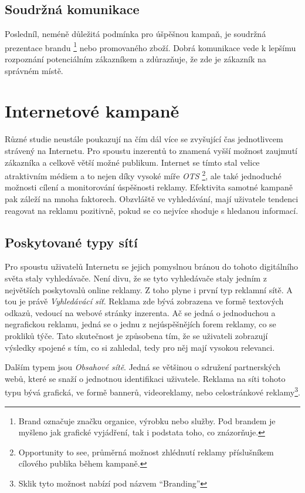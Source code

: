 \subsection{Soudržná komunikace}
Posledníl, neméně důležitá podmínka pro úšpěšnou kampaň, je soudržná prezentace brandu
\footnote{Brand označuje značku organice, výrobku nebo služby. Pod brandem je myšleno jak grafické vyjádření, tak i podstata toho, co znázorňuje.}
nebo promovaného zboží. Dobrá komunikace vede k lepšímu rozpoznání potenciálním zákazníkem a zdůrazňuje, že zde je zákazník na správném místě.

\section{Internetové kampaně}
Různé studie neustále poukazují na čím dál více se zvyšující čas jednotlivcem strávený na Internetu. Pro spoustu inzerentů to znamená vyšší možnost
zaujmutí zákazníka a celkově větší možné publikum. Internet se tímto stal velice atraktivním médiem a to nejen díky vysoké míře \emph{OTS}
\footnote{Opportunity to see, průměrná možnost zhlédnutí reklamy příslušníkem cílového publika během kampaně.},
ale také jednoduché možnosti cílení a monitorování úspěšnosti reklamy. Efektivita samotné kampaně pak záleží na mnoha faktorech.
Obzvláště ve vyhledávání, mají uživatele tendenci reagovat na reklamu pozitivně, pokud se co nejvíce shoduje s hledanou informací.
\cite{klapdor:effect}


\subsection{Poskytované typy sítí}
Pro spoustu uživatelů Internetu se jejich pomyslnou bránou do tohoto digitálního světa staly vyhledávače. Není divu, že se tyto vyhledávače staly jedním z největších
poskytovalů online reklamy. Z toho plyne i první typ reklamní sítě. A tou je právě \emph{Vyhledávácí síť}. Reklama zde bývá zobrazena ve formě textových odkazů,
vedoucí na webové stránky inzerenta. Ač se jedná o jednoduchou a negrafickou reklamu, jedná se o jednu z nejúspěšnějích forem reklamy, co se prokliků týče. Tato skutečnost
je způsobena tím, že se uživateli zobrazují výsledky spojené s tím, co si zahledal, tedy pro něj mají vysokou relevanci.

Dalším typem jsou \emph{Obsahové sítě}. Jedná se většinou o sdružení partnerských webů, které se snaží o jednotnou identifikaci uživatele. Reklama na síti tohoto typu bývá
grafická, ve formě bannerů, videoreklamy, nebo celostránkové reklamy\footnote{Sklik tyto možnost nabízí pod názvem \enquote{Branding}}.

